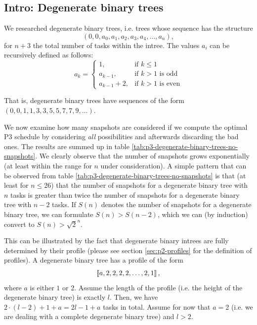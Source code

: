 \subsection{Intro: Degenerate binary trees}
\label{sec:p3-degenerate-trees-binary}

We researched degenerate binary trees, i.e. trees whose sequence has the structure
\begin{equation*}
  \left( 0,0,a_0,a_1,a_2,a_3,a_4,\dots,a_n \right),
\end{equation*}
for $n+3$ the total number of tasks within the intree. The values $a_i$ can be recursively defined as follows:
\begin{equation*}
  a_k =
  \begin{cases}
    1, & \text{if } k\leq 1 \\
    a_{k-1}, & \text{if } k>1 \text{ is odd} \\
    a_{k-1}+2, & \text{if } k>1 \text{ is even}
  \end{cases}
\end{equation*}

That is, degenerate binary trees have sequences of the form $(0,0,1,1,3,3,5,5,7,7,9,\dots)$.

We now examine how many snapshots are considered if we compute the optimal P3 schedule by considering \emph{all} possibilities and afterwards discarding the bad ones. The results are summed up in table \ref{tab:p3-degenerate-binary-trees-no-snapshots}. We clearly observe that the number of snapshots grows exponentially (at least within the range for $n$ under consideration). A simple pattern that can be observed from table \ref{tab:p3-degenerate-binary-trees-no-snapshots} is that (at least for $n\leq 26$) that the number of snapshots for a degenerate binary tree with $n$ tasks is greater than twice the number of snapshots for a degenerate binary tree with $n-2$ tasks. If $S(n)$ denotes the number of snapshots for a degenerate binary tree, we can formulate $S(n)>S(n-2)$, which we can (by induction) convert to $S(n) > \sqrt 2 ^ n$.

This can be illustrated by the fact that degenerate binary intrees are fully determined by their profile (please see section \ref{sec:p2-profiles} for the definition of profiles). A degenerate binary tree has a profile of the form
\begin{equation*}
  \left\llbracket a,2,2,2,2,\dots,2,1 \right\rrbracket,
\end{equation*}
where $a$ is either $1$ or $2$. Assume the length of the profile (i.e. the height of the degenerate binary tree) is exactly $l$. Then, we have $2\cdot(l-2)+1+a = 2l-1+a$ tasks in total. Assume for now that $a=2$ (i.e. we are dealing with a complete degenerate binary tree) and $l>2$.

